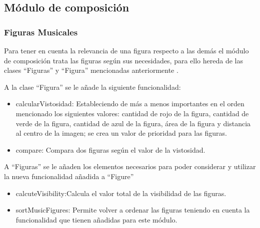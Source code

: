 \subsection{Módulo de composición}


\subsubsection{Figuras Musicales}

Para tener en cuenta la relevancia de una figura respecto a las demás el módulo de composición trata las figuras según sus necesidades, para ello hereda de las clases ``Figuras'' y ``Figura'' mencionadas anteriormente .


A la clase ``Figura'' se le añade la siguiente funcionalidad:
\begin{itemize}
\item{calcularVistosidad}: Estableciendo de más a menos importantes en el orden mencionado los siguientes valores: cantidad de rojo de la figura, cantidad de verde de la figura, cantidad de azul de la figura, área de la figura y distancia al centro de la imagen; se crea un valor de prioridad para las figuras.
\item{compare}: Compara dos figuras según el valor de la vistosidad.
\end{itemize}

A ``Figuras'' se le añaden los elementos necesarios para poder considerar y utilizar la nueva funcionalidad añadida a ``Figure''
\begin{itemize}
\item{calcuteVisibility}:Calcula el valor total de la visibilidad de las figuras.
\item{sortMusicFigures}: Permite volver a ordenar las figuras teniendo en cuenta la funcionalidad que tienen añadidas para este módulo.
\end{itemize}